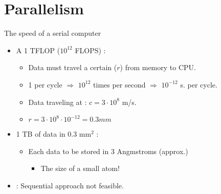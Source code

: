\section{Parallelism}

\begin{frame}[t]{The speed of a serial computer}
\begin{itemize}
  \item A 1 TFLOP ($10^{12}$ FLOPS) :
    \begin{itemize}
      \item Data must travel a certain  ($r$) from memory to CPU.
      \item 1  per cycle $\Rightarrow$ $10^{12}$ times per second $\Rightarrow$ $10^{-12}$ s. per cycle.
      \item Data traveling at : $c=3 \cdot 10^8$ m/s.
      \item $r = 3 \cdot 10^8 \cdot 10^{-12} = 0.3 mm$
    \end{itemize}

  \item 1 TB of data in 0.3 mm$^2$ :
    \begin{itemize}
      \item Each data to be stored in 3 Angmstroms (approx.)
        \begin{itemize}
          \item The size of a small atom!
        \end{itemize}
    \end{itemize}

  \item {}: Sequential approach not feasible.
\end{itemize}
\end{frame}

